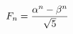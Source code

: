 \documentclass[preview]{standalone}
\begin{document}
\begin{align*}
\special{dvisvgm:raw <g id='unique000'>}F_n=\frac{\alpha^n-\beta^n}{\sqrt5}\special{dvisvgm:raw </g>}
\end{align*}
\end{document}

